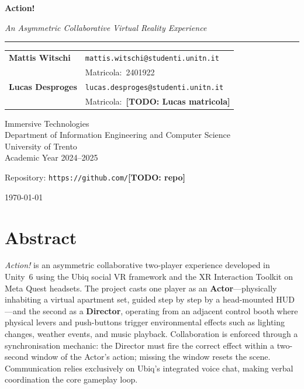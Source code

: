 \documentclass[12pt,a4paper]{article}
\newcommand{\todo}[1]{\textcolor{red!70!black}{\textbf{[TODO: #1]}}}
\begin{document}
\begin{titlepage}
  \centering
  \vspace*{1.5cm}

  {\fontsize{42}{50}\bfseries Action!\par}
  \vspace{0.4cm}
  {\large\itshape An Asymmetric Collaborative Virtual Reality Experience\par}

  \vspace{1.2cm}
  \rule{0.6\linewidth}{0.6pt}
  \vspace{1.2cm}

  {\normalsize
    \begin{tabular}{ll}
      \textbf{Mattis Witschi}   & \texttt{mattis.witschi@studenti.unitn.it}   \\
                                 & Matricola:\ 2401922 \\[0.6em]
      \textbf{Lucas Desproges}  & \texttt{lucas.desproges@studenti.unitn.it}  \\
                                 & Matricola:\ \todo{Lucas matricola} \\
    \end{tabular}
  }

  \vspace{1.6cm}
  {\normalsize
    Immersive Technologies \\[0.2em]
    Department of Information Engineering and Computer Science \\[0.2em]
    University of Trento \\[0.5em]
    Academic Year 2024--2025
  }

  \vspace{1.2cm}
  {\small Repository: \texttt{https://github.com/}\todo{repo}\par}
  \vfill
  {\small \today}
\end{titlepage}

\section*{Abstract}

\textit{Action!} is an asymmetric collaborative two-player experience developed in Unity~6 using the Ubiq social VR framework and the XR Interaction Toolkit on Meta Quest headsets. The project casts one player as an \textbf{Actor}---physically inhabiting a virtual apartment set, guided step by step by a head-mounted HUD---and the second as a \textbf{Director}, operating from an adjacent control booth where physical levers and push-buttons trigger environmental effects such as lighting changes, weather events, and music playback. Collaboration is enforced through a synchronisation mechanic: the Director must fire the correct effect within a two-second window of the Actor's action; missing the window resets the scene. Communication relies exclusively on Ubiq's integrated voice chat, making verbal coordination the core gameplay loop.
\end{document}
